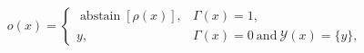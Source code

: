 \begin{equation}
o(x)=\begin{cases}
\operatorname{abstain}[\rho(x)], & \Gamma(x)=1,\\
y, & \Gamma(x)=0\ \text{and}\ \mathcal{Y}(x)=\{y\},
\end{cases}
\label{eq:guarded_abstention_policy}
\tag{6}
\end{equation}
